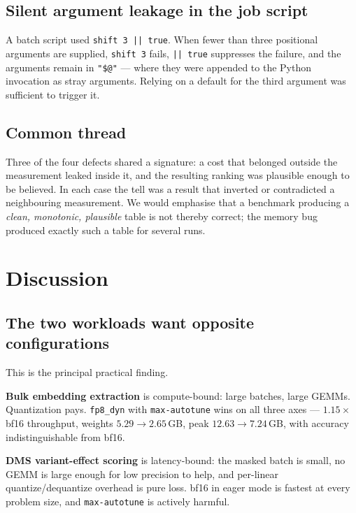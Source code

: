 \documentclass[11pt]{article}
\newcommand{\cfg}[1]{\texttt{#1}}
\begin{document}
\subsection{Silent argument leakage in the job script}

A batch script used \texttt{shift 3 || true}. When fewer than three positional
arguments are supplied, \texttt{shift 3} fails, \texttt{|| true} suppresses the
failure, and the arguments remain in \texttt{"\$@"} --- where they were appended
to the Python invocation as stray arguments. Relying on a default for the third
argument was sufficient to trigger it.

\subsection{Common thread}

Three of the four defects shared a signature: a cost that belonged outside the
measurement leaked inside it, and the resulting ranking was plausible enough to
be believed. In each case the tell was a result that inverted or contradicted a
neighbouring measurement. We would emphasise that a benchmark producing a
\emph{clean, monotonic, plausible} table is not thereby correct; the memory bug
produced exactly such a table for several runs.

\section{Discussion}

\subsection{The two workloads want opposite configurations}
\label{sec:opposite}

This is the principal practical finding.

\textbf{Bulk embedding extraction} is compute-bound: large batches, large GEMMs.
Quantization pays. \cfg{fp8\_dyn} with \texttt{max-autotune} wins on all three
axes --- $1.15\times$ bf16 throughput, weights $5.29 \to 2.65$\,GB, peak
$12.63 \to 7.24$\,GB, with accuracy indistinguishable from bf16.

\textbf{DMS variant-effect scoring} is latency-bound: the masked batch is small,
no GEMM is large enough for low precision to help, and per-linear
quantize/dequantize overhead is pure loss. bf16 in eager mode is fastest at
every problem size, and \texttt{max-autotune} is actively harmful.
\end{document}
